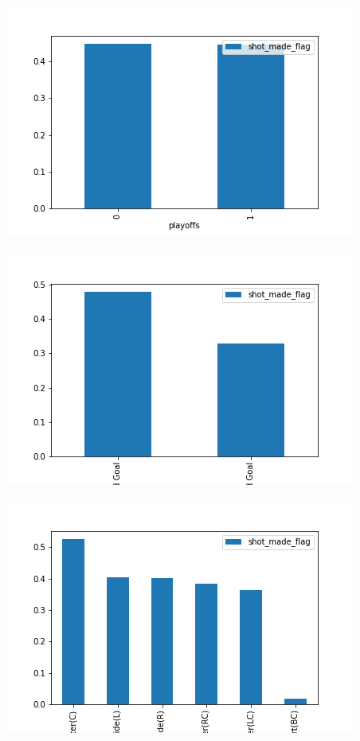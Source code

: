 \documentclass[a4paper,11pt,onecolumn,twoside]{article}
\begin{document}
\begin{figure}[htbp]
\begin{subfigure}[t]{0.30\textwidth}
	\end{subfigure}	
	\\
	\begin{subfigure}[t]{0.30\textwidth}
		\centering
		\includegraphics[width=1.0\textwidth]{playoffs.png}
	\end{subfigure}
	\quad
	\begin{subfigure}[t]{0.30\textwidth}
		\centering
		\includegraphics[width=1.0\textwidth]{shot_type.png}
	\end{subfigure}	
	\quad
	\begin{subfigure}[t]{0.30\textwidth}
		\centering
		\includegraphics[width=1.0\textwidth]{shot_zone_area.png}

\end{subfigure}
\end{figure}
\end{document}
